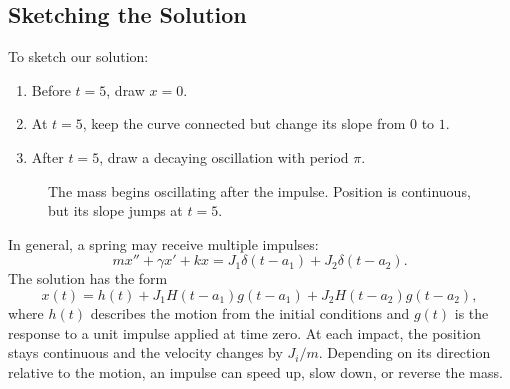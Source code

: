 \documentclass[10pt,letterpaper]{article}
\begin{document}
\subsection{Sketching the Solution}

To sketch our solution:
\begin{enumerate}
    \item Before $t=5$, draw $x=0$.
    \item At $t=5$, keep the curve connected but
    change its slope from $0$ to $1$.
    \item After $t=5$, draw a decaying oscillation
    with period $\pi$.
\end{enumerate}


\begin{figure}[H]
\centering
{}
\caption{The mass begins oscillating after the impulse.
Position is continuous, but its slope jumps at $t=5$.}
\end{figure}

In general, a spring may receive multiple impulses:
\[
mx''+\gamma x'+kx
=J_1\delta(t-a_1)+J_2\delta(t-a_2).
\]
The solution has the form
\[
x(t)=h(t)
+J_1H(t-a_1)g(t-a_1)
+J_2H(t-a_2)g(t-a_2),
\]
where $h(t)$ describes the motion from the initial
conditions and $g(t)$ is the response to a unit impulse
applied at time zero. At each impact, the position stays continuous and
the velocity changes by $J_i/m$. Depending on its
direction relative to the motion, an impulse can
speed up, slow down, or reverse the mass. 
\end{document}
